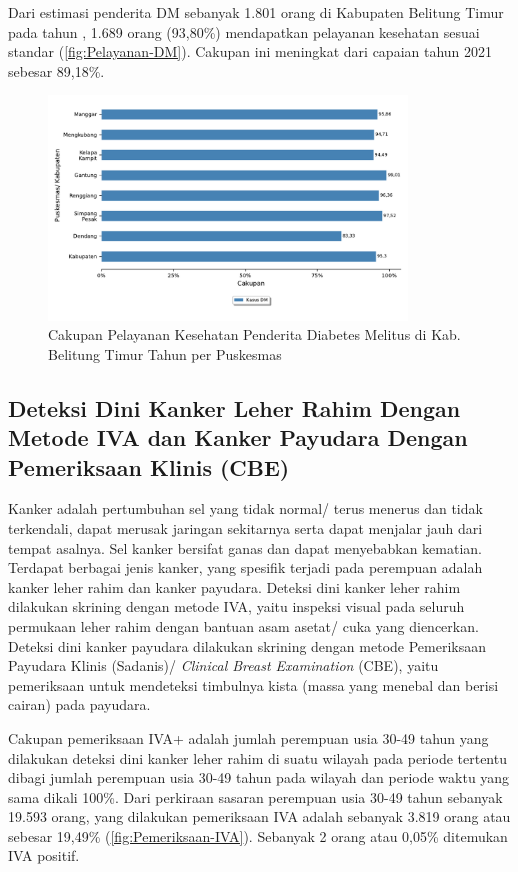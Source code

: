 Dari estimasi penderita DM sebanyak 1.801 orang di Kabupaten Belitung Timur pada tahun \tP, 1.689 orang (93,80\%) mendapatkan pelayanan kesehatan sesuai standar (\autoref{fig:Pelayanan-DM}).
Cakupan ini meningkat dari capaian tahun 2021 sebesar 89,18\%.

\begin{figure}[H]
  \centering
  \includegraphics[width=0.85\textwidth]{bab_06/bab_06_14_DM}
  \caption{Cakupan Pelayanan Kesehatan Penderita Diabetes Melitus di Kab. Belitung Timur Tahun \tP per Puskesmas}
  \label{fig:Pelayanan-DM}
\end{figure}

\subsection{Deteksi Dini Kanker Leher Rahim Dengan Metode IVA dan Kanker Payudara Dengan Pemeriksaan Klinis (CBE)}
Kanker adalah pertumbuhan sel yang tidak normal/ terus menerus dan tidak terkendali, dapat merusak jaringan sekitarnya serta dapat menjalar jauh dari tempat asalnya. Sel kanker bersifat ganas dan dapat menyebabkan kematian.
Terdapat berbagai jenis kanker, yang spesifik terjadi pada perempuan adalah kanker leher rahim dan kanker payudara.
Deteksi dini kanker leher rahim dilakukan skrining dengan metode IVA, yaitu inspeksi visual pada seluruh permukaan leher rahim dengan bantuan asam asetat/ cuka yang diencerkan.
Deteksi dini kanker payudara dilakukan skrining dengan metode Pemeriksaan Payudara Klinis (Sadanis)/ \emph{Clinical Breast Examination} (CBE), yaitu pemeriksaan untuk mendeteksi timbulnya kista (massa yang menebal dan berisi cairan) pada payudara.

Cakupan pemeriksaan IVA+ adalah jumlah perempuan usia 30-49 tahun yang dilakukan deteksi dini kanker leher rahim di suatu wilayah pada periode tertentu dibagi jumlah perempuan usia 30-49 tahun pada wilayah dan periode waktu yang sama dikali 100\%.
Dari perkiraan sasaran perempuan usia 30-49 tahun sebanyak 19.593 orang, yang dilakukan pemeriksaan IVA adalah sebanyak 3.819 orang atau sebesar 19,49\% (\autoref{fig:Pemeriksaan-IVA}).
Sebanyak 2 orang atau 0,05\% ditemukan IVA positif.


